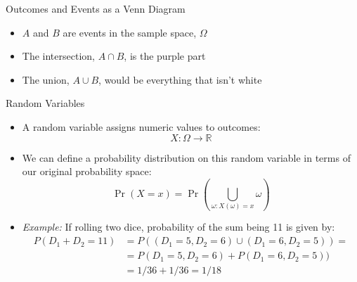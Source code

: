 \documentclass[aspectratio=169,11pt]{beamer}
\begin{document}
\begin{frame}{Outcomes and Events as a Venn Diagram}


\def\firstcircle{(0,0) circle (1.5cm)}
\def\secondcircle{(0:2cm) circle (1.5cm)}

\begin{figure}
	\centering
{}
\end{figure}
\begin{itemize}
	\item $A$ and $B$ are events in the sample space, $\Omega$
	\item The intersection, $A\cap B$, is the purple part	
	\item The union, $A\cup B$, would be everything that isn't white
\end{itemize}


\end{frame}


\begin{frame}{Random Variables}
\begin{itemize}
	\item A random variable assigns numeric values to outcomes:\[
		X:\Omega \rightarrow \mathbb{R}
	\]

	\item We can define a probability distribution on this random variable in terms of our original probability space:	\[
				\Pr(X=x) = \Pr\left(\bigcup_{\omega:X(\omega)=x} \omega\right)
			\]
			
	\item \emph{Example:} If rolling two dice, probability of the sum being 11 is given by:
\begin{align*}	
P(D_1+D_2 = 11) &= P((D_1=5, D_2=6) \cup (D_1=6, D_2=5)) =\\
 &= P(D_1=5, D_2=6) + P(D_1=6, D_2=5)) \\
 &= 1/36 + 1/36 = 1/18
\end{align*}
\end{itemize}
\end{frame}
\end{document}
